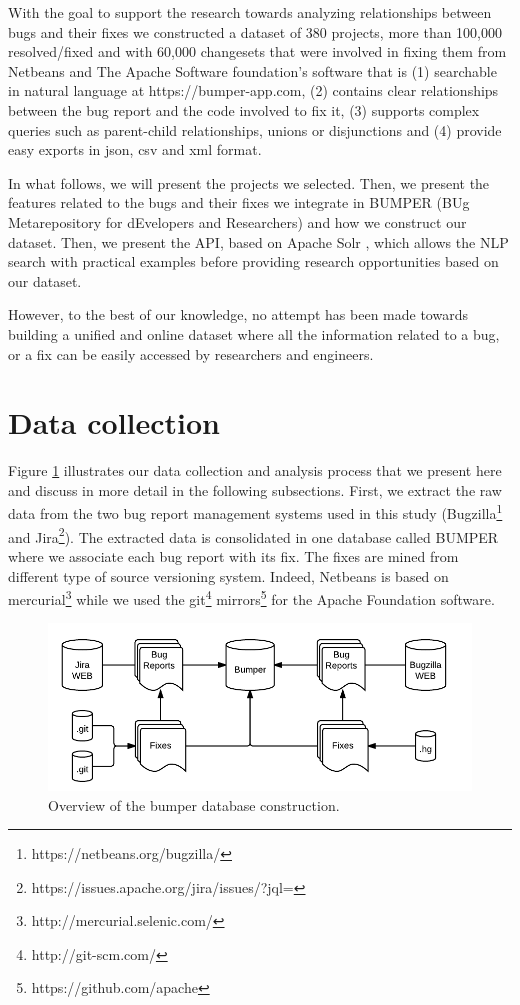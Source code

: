 
With the goal to support the research towards analyzing relationships between bugs and their fixes we constructed a dataset of 380 projects, more than 100,000 resolved/fixed and with 60,000 changesets that were involved in fixing them from Netbeans and The Apache Software foundation's software that is (1) searchable in natural language at https://bumper-app.com, (2) contains clear relationships between the bug report and the code involved to fix it, (3) supports complex queries such as parent-child relationships, unions or disjunctions and (4) provide easy exports in json, csv and xml format.

In what follows, we will present the projects we selected. Then, we present the features related to the bugs and their fixes we integrate in BUMPER (BUg Metarepository for dEvelopers and Researchers) and how we construct our dataset. Then, we present the API, based on Apache Solr \cite{Nayrolles2014b}, which allows the NLP search with practical examples before providing research opportunities based on our dataset.


However, to the best of our knowledge, no attempt has been made towards building a unified and online dataset where all the information related to a bug, or a fix can be easily accessed by researchers and engineers.

\section{Data collection\label{sec:data-collection}}

Figure \ref{fig:bumper-approach} illustrates our data collection and analysis process that we present here and discuss in more detail in the following subsections. First, we extract the raw data from the two bug report management systems used in this study (Bugzilla\footnote{https://netbeans.org/bugzilla/} and Jira\footnote{https://issues.apache.org/jira/issues/?jql=}). The extracted data is consolidated in one database called BUMPER where we associate each bug report with its fix. The fixes are mined from different type of source versioning system. Indeed, Netbeans is based on mercurial\footnote{ http://mercurial.selenic.com/} while we used the git\footnote{http://git-scm.com/} mirrors\footnote{https://github.com/apache} for the Apache Foundation software.

\begin{figure}[h!]
  \centering
    \includegraphics{media/bumper-approach.png}
    \caption{Overview of the bumper database construction.
    \label{fig:bumper-approach}}
\end{figure}


